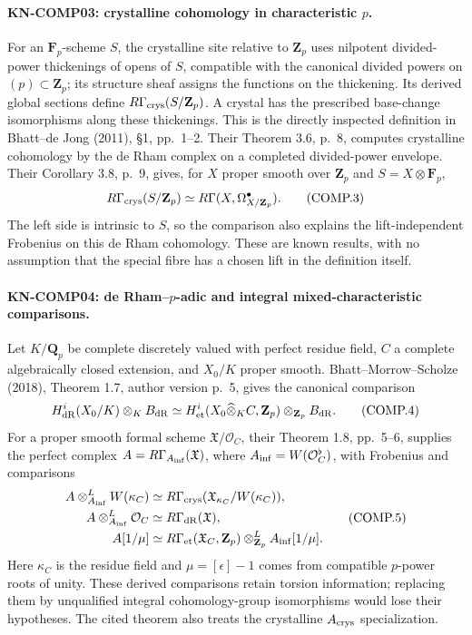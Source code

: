 \documentclass[11pt,a4paper]{article}
\theoremstyle{definition}\newtheorem{definition}[theorem]{Definition}
\theoremstyle{remark}\newtheorem{remark}[theorem]{Remark}
\begin{document}
\paragraph{KN-COMP03: crystalline cohomology in characteristic
\texorpdfstring{$p$}{p}.}
For an $\mathbf F_p$-scheme $S$, the crystalline site relative to
$\mathbf Z_p$ uses nilpotent divided-power thickenings of opens of
$S$, compatible with the canonical divided powers on $(p)\subset\mathbf Z_p$; its structure sheaf assigns the functions on the thickening.
Its derived global sections define $R\Gamma_{\rm crys}(S/\mathbf Z_p)$.
A crystal has the prescribed base-change isomorphisms along these
thickenings.  This is the directly inspected definition in
Bhatt--de Jong (2011), \S1, pp.~1--2.
Their Theorem 3.6, p.~8, computes crystalline cohomology by the
de Rham complex on a completed divided-power envelope.  Their
Corollary 3.8, p.~9, gives, for $X$ proper smooth over $\mathbf Z_p$
and $S=X\otimes\mathbf F_p$,
\[
 R\Gamma_{\rm crys}(S/\mathbf Z_p)
        \simeq R\Gamma(X,\Omega^\bullet_{X/\mathbf Z_p}).
 \tag{COMP.3}
\]
The left side is intrinsic to $S$, so the comparison also explains
the lift-independent Frobenius on this de Rham cohomology.
These are known results, with no assumption that the special fibre
has a chosen lift in the definition itself.

\paragraph{KN-COMP04: de Rham--\texorpdfstring{$p$}{p}-adic and
integral mixed-characteristic comparisons.}
Let $K/\mathbf Q_p$ be complete discretely valued with perfect
residue field, $C$ a complete algebraically closed extension, and
$X_0/K$ proper smooth.  Bhatt--Morrow--Scholze (2018), Theorem 1.7,
author version p.~5, gives the canonical comparison
\[
 H^i_{\rm dR}(X_0/K)\otimes_K B_{\rm dR}
    \simeq H^i_{\rm et}(X_0\widehat\otimes_K C,\mathbf Z_p)
                    \otimes_{\mathbf Z_p}B_{\rm dR}.
 \tag{COMP.4}
\]
For a proper smooth formal scheme $\mathfrak X/\mathcal O_C$, their
Theorem 1.8, pp.~5--6, supplies the perfect complex
$A=R\Gamma_{A_{\rm inf}}(\mathfrak X)$, where
$A_{\rm inf}=W(\mathcal O_C^\flat)$, with Frobenius and comparisons
\[
\begin{aligned}
 A\otimes^{L}_{A_{\rm inf}}W(\kappa_C)
   &\simeq R\Gamma_{\rm crys}(\mathfrak X_{\kappa_C}/W(\kappa_C)),\\
 A\otimes^{L}_{A_{\rm inf}}\mathcal O_C
   &\simeq R\Gamma_{\rm dR}(\mathfrak X),\\
 A[1/\mu]&\simeq
 R\Gamma_{\rm et}(\mathfrak X_C,\mathbf Z_p)
       \otimes^L_{\mathbf Z_p}A_{\rm inf}[1/\mu].
\end{aligned}
 \tag{COMP.5}
\]
Here $\kappa_C$ is the residue field and
$\mu=[\epsilon]-1$ comes from compatible $p$-power roots of unity.
These derived comparisons retain torsion information; replacing them
by unqualified integral cohomology-group isomorphisms would lose
their hypotheses.  The cited theorem also treats the crystalline
$A_{\rm crys}$ specialization.
\end{document}
